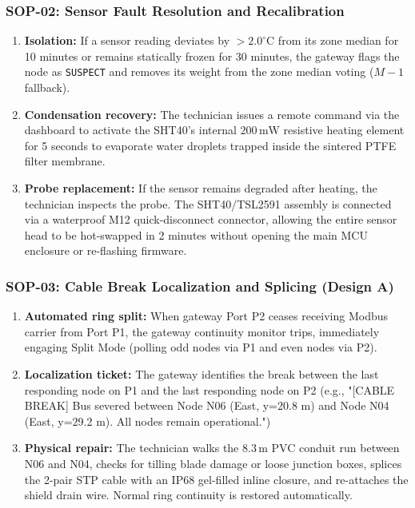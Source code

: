 \documentclass[11pt,a4paper]{report}
\begin{document}
\subsubsection{SOP-02: Sensor Fault Resolution and Recalibration}
\begin{enumerate}[noitemsep]
  \item \textbf{Isolation:} If a sensor reading deviates by $> 2.0^\circ\text{C}$ from its zone median for 10 minutes or remains statically frozen for 30 minutes, the gateway flags the node as \texttt{SUSPECT} and removes its weight from the zone median voting ($M-1$ fallback).
  \item \textbf{Condensation recovery:} The technician issues a remote command via the dashboard to activate the SHT40's internal $200\,\text{mW}$ resistive heating element for 5 seconds to evaporate water droplets trapped inside the sintered PTFE filter membrane.
  \item \textbf{Probe replacement:} If the sensor remains degraded after heating, the technician inspects the probe. The SHT40/TSL2591 assembly is connected via a waterproof M12 quick-disconnect connector, allowing the entire sensor head to be hot-swapped in 2 minutes without opening the main MCU enclosure or re-flashing firmware.
\end{enumerate}

\subsubsection{SOP-03: Cable Break Localization and Splicing (Design A)}
\begin{enumerate}[noitemsep]
  \item \textbf{Automated ring split:} When gateway Port P2 ceases receiving Modbus carrier from Port P1, the gateway continuity monitor trips, immediately engaging Split Mode (polling odd nodes via P1 and even nodes via P2).
  \item \textbf{Localization ticket:} The gateway identifies the break between the last responding node on P1 and the last responding node on P2 (e.g., \textsf{"[CABLE BREAK] Bus severed between Node N06 (East, y=20.8 m) and Node N04 (East, y=29.2 m). All nodes remain operational."})
  \item \textbf{Physical repair:} The technician walks the 8.3\,m PVC conduit run between N06 and N04, checks for tilling blade damage or loose junction boxes, splices the 2-pair STP cable with an IP68 gel-filled inline closure, and re-attaches the shield drain wire. Normal ring continuity is restored automatically.
\end{enumerate}
\end{document}
